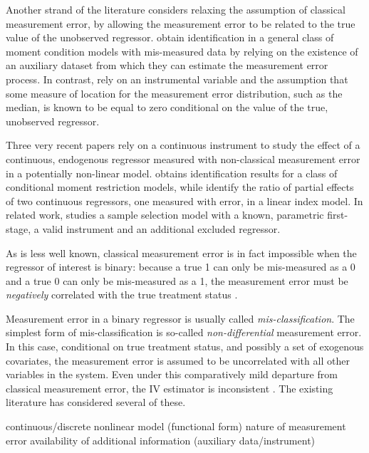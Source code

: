 Another strand of the literature considers relaxing the assumption of classical measurement error, by allowing the measurement error to be related to the true value of the unobserved regressor.
\cite{ChenHongTamer} obtain identification in a general class of moment condition models with mis-measured data by relying on the existence of an auxiliary dataset from which they can estimate the measurement error process.
In contrast, \cite{HuSchennach} rely on an instrumental variable and the assumption that some measure of location for the measurement error distribution, such as the median, is known to be equal to zero conditional on the value of the true, unobserved regressor.

Three very recent papers rely on a continuous instrument to study the effect of a continuous, endogenous regressor measured with non-classical measurement error in a potentially non-linear model. 
\cite{song2015} obtains identification results for a class of conditional moment restriction models, while  \cite{HuShiuWoutersen} identify the ratio of partial effects of two continuous regressors, one measured with error, in a linear index model. 
In related work, \cite{shiu2015} studies a sample selection model with a known, parametric first-stage, a valid instrument and an additional excluded regressor.



As is less well known, classical measurement error is in fact impossible when the regressor of interest is binary: because a true 1 can only be mis-measured as a 0 and a true 0 can only be mis-measured as a 1, the measurement error must be \emph{negatively} correlated with the true treatment status \citep{Aigner,Bollinger}. 

Measurement error in a binary regressor is usually called \emph{mis-classification}.
The simplest form of mis-classification is so-called \emph{non-differential} measurement error.
In this case, conditional on true treatment status, and possibly a set of exogenous covariates, the measurement error is assumed to be uncorrelated with all other variables in the system.
Even under this comparatively mild departure from classical measurement error, the IV estimator is inconsistent \citep{BBS, KRS}. 
The existing literature has considered several of these. 


continuous/discrete
nonlinear model (functional form)
nature of measurement error
availability of additional information (auxiliary data/instrument)



